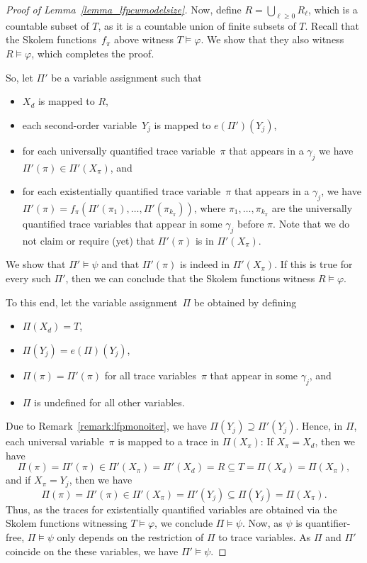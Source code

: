 \documentclass[dvipsnames,10pt,a4paper]{amsart}
\theoremstyle{definition}
\theoremstyle{remark}
\renewcommand{\phi}{\varphi}
\newcommand{\unidisvar}{X_d}
\newcommand{\itereval}{e}
\begin{document}
\begin{proof}[Proof of Lemma~\ref{lemma_lfpcwmodelsize}]
Now, define $R = \bigcup_{\ell \ge 0} R_\ell$, which is a countable subset of $T$, as it is a countable union of finite subsets of $T$.
Recall that the Skolem functions~$f_\pi$ above witness $T \models \phi$.
We show that they also witness $R \models \phi$, which completes the proof.

So, let $\Pi'$ be a variable assignment such that
\begin{itemize}
    \item $\unidisvar$ is mapped to $R$,
    \item each second-order variable~$Y_j$ is mapped to $\itereval(\Pi')(Y_j)$,
    \item for each universally quantified trace variable~$\pi$ that appears in a $\gamma_j$ we have $\Pi'(\pi) \in \Pi'(X_\pi)$, and
    \item for each existentially quantified trace variable~$\pi$ that appears in a $\gamma_j$, we have $\Pi'(\pi) = f_{\pi}(\Pi'(\pi_1), \ldots, \Pi'(\pi_{k_\pi}))$, where $\pi_1, \ldots, \pi_{k_\pi}$ are the universally quantified trace variables that appear in some $\gamma_j$ before $\pi$. Note that we do not claim or require (yet) that $\Pi'(\pi)$ is in $\Pi'(X_\pi)$.
\end{itemize}
We show that $\Pi' \models \psi$ and that $\Pi'(\pi)$ is indeed in $\Pi'(X_\pi)$. 
If this is true for every such $\Pi'$, then we can conclude that the Skolem functions witness $R \models \varphi$.

To this end, let the variable assignment~$\Pi$ be obtained by defining
\begin{itemize}
    \item $\Pi(\unidisvar) = T$, 
    \item $\Pi(Y_j) = \itereval(\Pi)(Y_j)$, 
    \item $\Pi(\pi) = \Pi'(\pi)$ for all trace variables~$\pi$ that appear in some $\gamma_j$, and
    \item $\Pi$ is undefined for all other variables.
\end{itemize}

Due to Remark~\ref{remark:lfpmonoiter}, we have $\Pi(Y_j) \supseteq \Pi'(Y_j)$.
Hence, in $\Pi$, each universal variable~$\pi$ is mapped to a trace in $\Pi(X_\pi)$: If $X_\pi = \unidisvar$, then we have \[\Pi(\pi) = \Pi'(\pi) \in \Pi'(X_\pi) = \Pi'(\unidisvar) = R \subseteq T = \Pi(\unidisvar) = \Pi(X_\pi),\]
and if $X_\pi = Y_j$, then we have
\[
\Pi(\pi) = \Pi'(\pi) \in \Pi'(X_\pi) = \Pi'(Y_j) \subseteq \Pi(Y_j) = \Pi(X_\pi).
\]
Thus, as the traces for existentially quantified variables are obtained via the Skolem functions witnessing $T \models \varphi$, we conclude $\Pi \models \psi$.
Now, as $\psi$ is quantifier-free, $\Pi\models\psi$ only depends on the restriction of $\Pi$ to trace variables. 
As $\Pi$ and $\Pi'$ coincide on the these variables, we have $\Pi'\models\psi$.


\end{proof}
\end{document}
